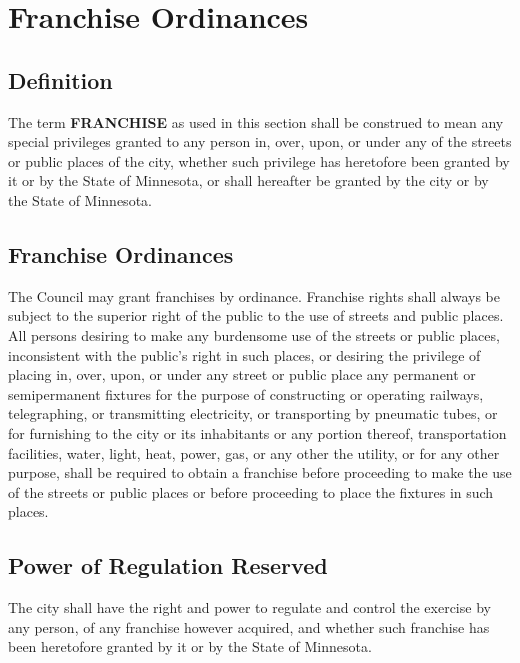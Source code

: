 \section{Franchise Ordinances}
\subsection{Definition}
The term \textbf{FRANCHISE} as used in this section shall be construed to mean any special privileges granted to any person in, over, upon, or under any of the streets or public places of the city, whether such privilege has heretofore been granted by it or by the State of Minnesota, or shall hereafter be granted by the city or by the State of Minnesota.
\subsection{Franchise Ordinances}
The Council may grant franchises by ordinance. Franchise rights shall always be subject to the superior right of the public to the use of streets and public places. All persons desiring to make any burdensome use of the streets or public places, inconsistent with the public’s right in such places, or desiring the privilege of placing in, over, upon, or under any street or public place any permanent or semipermanent fixtures for the purpose of constructing or operating railways, telegraphing, or transmitting electricity, or transporting by pneumatic tubes, or for furnishing to the city or its inhabitants or any portion thereof, transportation facilities, water, light, heat, power, gas, or any other the utility, or for any other purpose, shall be required to obtain a franchise before proceeding to make the use of the streets or public places or before proceeding to place the fixtures in such places.
\subsection{Power of Regulation Reserved}
The city shall have the right and power to regulate and control the exercise by any person, of any franchise however acquired, and whether such franchise has been heretofore granted by it or by the State of Minnesota.
